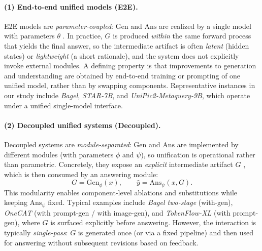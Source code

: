 \documentclass{article}
\theoremstyle{plain}
\theoremstyle{definition}
\theoremstyle{remark}
\begin{document}
\paragraph{(1) End-to-end unified models (E2E).}
E2E models are \emph{parameter-coupled}: $\mathrm{Gen}$ and $\mathrm{Ans}$ are realized by a single model with parameters $\theta$
. In practice, $G$ is produced \emph{within} the same forward process that yields
the final answer, so the intermediate artifact is often \emph{latent} (hidden states) or \emph{lightweight} (a short rationale),
and the system does not explicitly invoke external modules. A defining property is that improvements to generation and understanding
are obtained by end-to-end training or prompting of one unified model, rather than by swapping components.
Representative instances in our study include \emph{Bagel}, \emph{STAR-7B}, and
\emph{UniPic2-Metaquery-9B}, which operate under a unified single-model interface.

\paragraph{(2) Decoupled unified systems (Decoupled).}
Decoupled systems are \emph{module-separated}: $\mathrm{Gen}$ and $\mathrm{Ans}$ are implemented by different modules
(with parameters $\phi$ and $\psi$), so unification is operational rather than parametric.
Concretely, they expose an \emph{explicit} intermediate artifact $G$ , which is then consumed by an answering module:
\begin{equation}
G = \mathrm{Gen}_{\phi}(x), \qquad \hat{y} = \mathrm{Ans}_{\psi}(x, G).
\end{equation}
This modularity enables component-level ablations and substitutions while keeping $\mathrm{Ans}_\psi$ fixed.
Typical examples include \emph{Bagel two-stage} (with-gen), \emph{OneCAT} (with prompt-gen / with image-gen), and
\emph{TokenFlow-XL} (with prompt-gen), where $G$ is surfaced explicitly before answering.
However, the interaction is typically \emph{single-pass}: $G$ is generated once (or via a fixed pipeline) and then used for answering
without subsequent revisions based on feedback.
\end{document}

